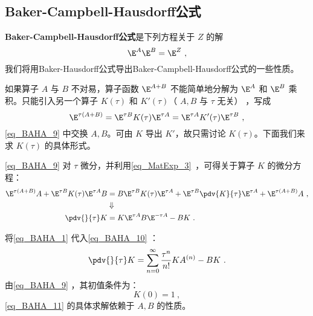 \subsection{Baker-Campbell-Hausdorff公式}
\textbf{Baker-Campbell-Hausdorff公式}是下列方程关于 $Z$ 的解
\begin{equation}
\E^{A}\E^{B}=\E^{Z}~,
\end{equation}
我们将用Baker-Hausdorff公式导出Baker-Campbell-Hausdorff公式的一些性质。

如果算子 $A$ 与 $B$ 不对易，算子函数 $\E^{A+B}$ 不能简单地分解为  $\E^{A}$ 和 $\E^{B}$ 乘积。只能引入另一个算子 $K(\tau)$ 和 $K'(\tau)$（ $A,B$ 与 $\tau$ 无关） ，写成
\begin{equation}\label{eq_BAHA_9}
\E^{\tau(A+B)}=\E^{\tau B}K(\tau)\E^{\tau A}=\E^{\tau A}K'(\tau)\E^{\tau B}~,
\end{equation}
\autoref{eq_BAHA_9} 中交换 $A,B$。可由 $K$ 导出 $K'$，故只需讨论 $K(\tau)$。下面我们来求 $K(\tau)$ 的具体形式。

\autoref{eq_BAHA_9} 对 $\tau$ 微分，并利用\autoref{eq_MatExp_3}~，可得关于算子 $K$ 的微分方程：
\begin{equation}\label{eq_BAHA_10}
\begin{aligned}
\E^{\tau(A+B)}A+\E^{\tau B}K(\tau)\E^{\tau A}B&=B\E^{\tau B}K(\tau)\E^{\tau A}+\E^{\tau B}\pdv{K}{\tau}\E^{\tau A}+\E^{\tau(A+B)}A~,\\
&\Downarrow\\
\pdv{}{\tau}K&=K\E^{\tau A}B\E^{-\tau A}-BK~.
\end{aligned}
\end{equation}

将\autoref{eq_BAHA_1} 代入\autoref{eq_BAHA_10} ：
\begin{equation}\label{eq_BAHA_11}
\pdv{}{\tau}K=\sum_{n=0}^{\infty}\frac{\tau^n}{n!}KA^{(n)}-BK~.
\end{equation}
由\autoref{eq_BAHA_9} ，其初值条件为：
\begin{equation}
K(0)=1~,
\end{equation}
\autoref{eq_BAHA_11} 的具体求解依赖于 $A,B$ 的性质。

